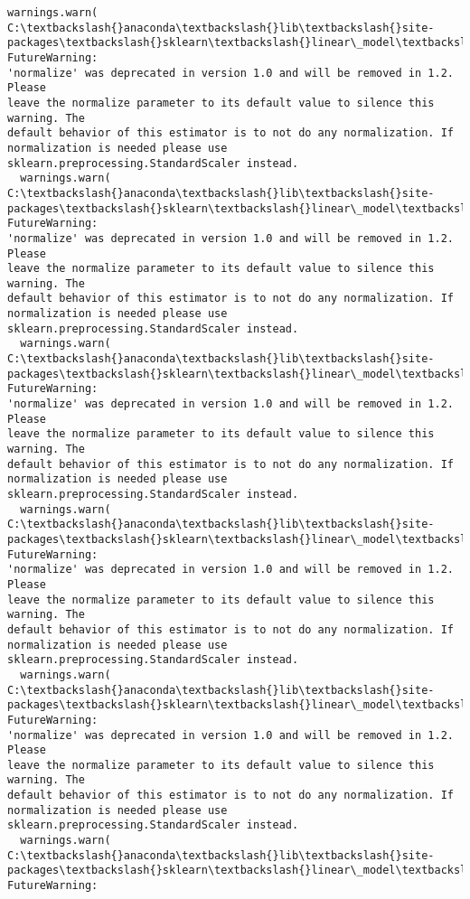 \documentclass[11pt]{article}
\begin{document}
\begin{Verbatim}[commandchars=\\\{\}]
  warnings.warn(
C:\textbackslash{}anaconda\textbackslash{}lib\textbackslash{}site-packages\textbackslash{}sklearn\textbackslash{}linear\_model\textbackslash{}\_base.py:148: FutureWarning:
'normalize' was deprecated in version 1.0 and will be removed in 1.2. Please
leave the normalize parameter to its default value to silence this warning. The
default behavior of this estimator is to not do any normalization. If
normalization is needed please use sklearn.preprocessing.StandardScaler instead.
  warnings.warn(
C:\textbackslash{}anaconda\textbackslash{}lib\textbackslash{}site-packages\textbackslash{}sklearn\textbackslash{}linear\_model\textbackslash{}\_base.py:148: FutureWarning:
'normalize' was deprecated in version 1.0 and will be removed in 1.2. Please
leave the normalize parameter to its default value to silence this warning. The
default behavior of this estimator is to not do any normalization. If
normalization is needed please use sklearn.preprocessing.StandardScaler instead.
  warnings.warn(
C:\textbackslash{}anaconda\textbackslash{}lib\textbackslash{}site-packages\textbackslash{}sklearn\textbackslash{}linear\_model\textbackslash{}\_base.py:148: FutureWarning:
'normalize' was deprecated in version 1.0 and will be removed in 1.2. Please
leave the normalize parameter to its default value to silence this warning. The
default behavior of this estimator is to not do any normalization. If
normalization is needed please use sklearn.preprocessing.StandardScaler instead.
  warnings.warn(
C:\textbackslash{}anaconda\textbackslash{}lib\textbackslash{}site-packages\textbackslash{}sklearn\textbackslash{}linear\_model\textbackslash{}\_base.py:148: FutureWarning:
'normalize' was deprecated in version 1.0 and will be removed in 1.2. Please
leave the normalize parameter to its default value to silence this warning. The
default behavior of this estimator is to not do any normalization. If
normalization is needed please use sklearn.preprocessing.StandardScaler instead.
  warnings.warn(
C:\textbackslash{}anaconda\textbackslash{}lib\textbackslash{}site-packages\textbackslash{}sklearn\textbackslash{}linear\_model\textbackslash{}\_base.py:148: FutureWarning:
'normalize' was deprecated in version 1.0 and will be removed in 1.2. Please
leave the normalize parameter to its default value to silence this warning. The
default behavior of this estimator is to not do any normalization. If
normalization is needed please use sklearn.preprocessing.StandardScaler instead.
  warnings.warn(
C:\textbackslash{}anaconda\textbackslash{}lib\textbackslash{}site-packages\textbackslash{}sklearn\textbackslash{}linear\_model\textbackslash{}\_base.py:148: FutureWarning:

\end{Verbatim}
\end{document}
